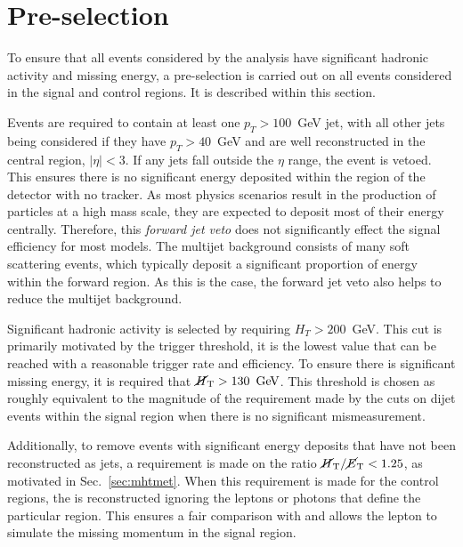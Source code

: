 \section{Pre-selection}%
\label{sec:preselection}

To ensure that all events considered by the analysis have
significant hadronic activity and missing energy, a pre-selection is
carried out on all events considered in the signal and control
regions. It is described within this section.

Events are required to contain at least one $p_T>100$~GeV jet,
with all other jets being considered if they have $p_T>40$~GeV and are
well reconstructed in the central region, $|\eta|<3$. If any jets
fall outside the $\eta$ range, the event is vetoed. This ensures there
is no significant energy deposited within the region of the detector
with no tracker. As most \BSM physics scenarios result in the
production of particles at a high mass scale, they are expected to deposit
most of their energy centrally. Therefore, this \emph{forward jet
veto} does not significantly effect the signal efficiency for most
models. The \QCD multijet background consists of many
soft scattering events, which typically deposit a significant
proportion of energy within the forward region. As this is the case,
the forward jet veto also helps to reduce the multijet
background.

Significant hadronic activity is selected by requiring $H_T>200$~GeV.
This cut is primarily motivated by the trigger threshold, it is the
lowest \HT value that can be reached with a reasonable trigger rate
and efficiency. To ensure there is significant missing energy, it is
required that $\mbox{$\cancel{H}_\text{T}$}>130~\mathrm{\,Ge\kern -0.1em V}$.  This threshold is chosen as roughly
equivalent to the magnitude of the \MHT requirement made by the
\alphat cuts on dijet events within the signal region when there is no
significant mismeasurement. 

Additionally, to remove events with significant energy deposits that
have not been reconstructed as jets, a requirement is made on the
ratio $\mbox{$\mbox{$\cancel{H}_\text{T}$} / \mbox{$\cancel{E}_\text{T}$}$}<1.25$, as motivated in Sec.~\ref{sec:mhtmet}.  When
this requirement is made for the control regions, the \MET is
reconstructed ignoring the leptons or photons that define the
particular region. This ensures a fair comparison with \MHT and allows
the lepton to simulate the missing momentum in the 
signal region.

